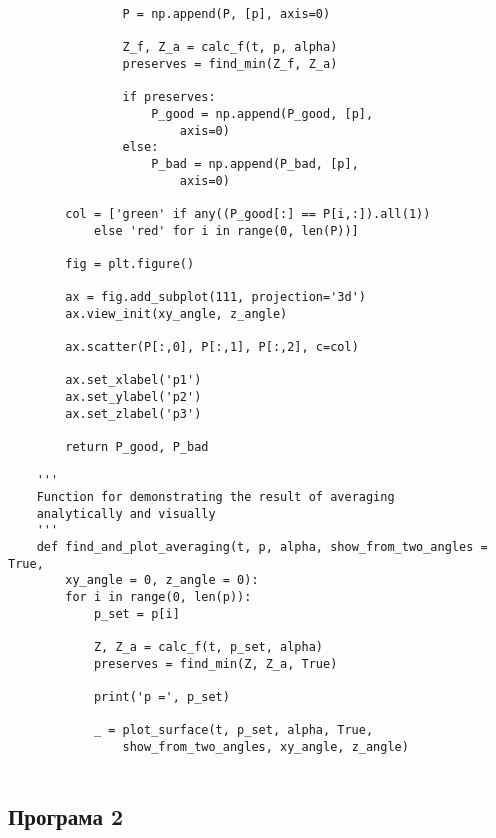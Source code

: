 \documentclass[12pt]{article}
\begin{document}
\begin{verbatim}
				P = np.append(P, [p], axis=0)
				
				Z_f, Z_a = calc_f(t, p, alpha)
				preserves = find_min(Z_f, Z_a)
				
				if preserves:
					P_good = np.append(P_good, [p], 
						axis=0)
				else:
					P_bad = np.append(P_bad, [p], 
						axis=0)
				
		col = ['green' if any((P_good[:] == P[i,:]).all(1))
	 		else 'red' for i in range(0, len(P))]
		
		fig = plt.figure()
		
		ax = fig.add_subplot(111, projection='3d')
		ax.view_init(xy_angle, z_angle)
		
		ax.scatter(P[:,0], P[:,1], P[:,2], c=col)
		
		ax.set_xlabel('p1')
		ax.set_ylabel('p2')
		ax.set_zlabel('p3')
		
		return P_good, P_bad
	
	'''
	Function for demonstrating the result of averaging
	analytically and visually
	'''
	def find_and_plot_averaging(t, p, alpha, show_from_two_angles = True, 
		xy_angle = 0, z_angle = 0):
		for i in range(0, len(p)):
			p_set = p[i]
			
			Z, Z_a = calc_f(t, p_set, alpha)
			preserves = find_min(Z, Z_a, True)
			
			print('p =', p_set)
			
			_ = plot_surface(t, p_set, alpha, True, 
				show_from_two_angles, xy_angle, z_angle)
	
\end{verbatim}

\subsection{Програма 2}
\end{document}
